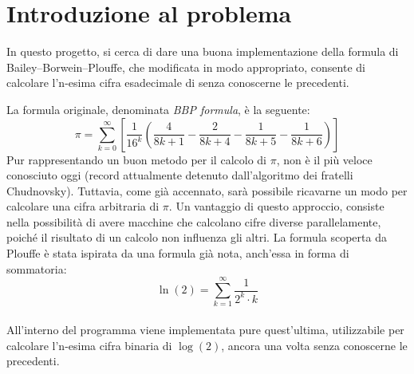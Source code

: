 \section{Introduzione al problema}
In questo progetto, si cerca di dare una buona implementazione della formula di Bailey–Borwein–Plouffe, che modificata in modo appropriato, consente di calcolare l'n-esima cifra esadecimale di \p senza conoscerne le precedenti.

\noindent La formula originale, denominata \textit{BBP formula}, è la seguente:
\begin{equation*}
\pi = \sum\limits_{k=0}^{\infty} \left[ \frac{1}{16^k}\left( \frac{4}{8k+1} - \frac{2}{8k+4} - \frac{1}{8k+5} - \frac{1}{8k+6} \right) \right]
\end{equation*}
Pur rappresentando un buon metodo per il calcolo di $\pi$, non è il più veloce conosciuto oggi (record attualmente detenuto dall'algoritmo dei fratelli Chudnovsky). Tuttavia, come già accennato, sarà possibile ricavarne un modo per calcolare una cifra arbitraria di $\pi$.
Un vantaggio di questo approccio, consiste nella possibilità di avere macchine che calcolano cifre diverse parallelamente, poiché il risultato di un calcolo non influenza gli altri.
\bigbreak \noindent
La formula scoperta da Plouffe è stata ispirata da una formula già nota, anch'essa in forma di sommatoria:
$$ \ln(2)= \sum\limits_{k=1}^{\infty} \frac{1}{2^k \cdot k} $$
\\
All'interno del programma viene implementata pure quest'ultima, utilizzabile per calcolare l'n-esima cifra binaria di $\log(2)$, ancora una volta senza conoscerne le precedenti.
